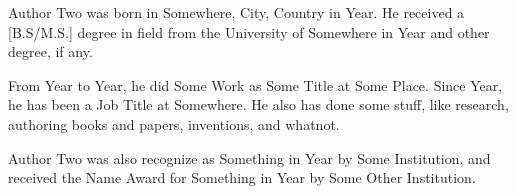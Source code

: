 \begin{IEEEbiography}{Author Two} was born in Somewhere, City, Country in 
Year. He received a [B.S/M.S.] degree in field from 
the University of Somewhere in Year and other degree, if any.

From Year to Year, he did Some Work as Some Title at Some Place. Since Year, he has been a Job Title at Somewhere. 
He also has done some stuff, like research, authoring books and papers, inventions, and whatnot. 

Author Two was also recognize as Something in Year by Some Institution, and received the Name Award for Something in Year by Some Other Institution.
\end{IEEEbiography}